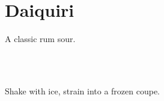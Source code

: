 \section[Daiquiri]{Daiquiri}


\begin{recipestats}[
	servings=1,
	preptime=5~\minute,
	original=\citefield{cocktailSeminars2021}{title}~\cite{cocktailSeminars2021},
]
\end{recipestats}


\begin{recipeabstract}
	A classic rum sour.
\end{recipeabstract}


\begin{ingredientcolumns}[1]
	\begin{ingredientblock}
		\\
		\\
	\end{ingredientblock}
\end{ingredientcolumns}


\begin{preparation}
	\item Shake with ice, strain into a frozen coupe.
\end{preparation}


\recipeend%
